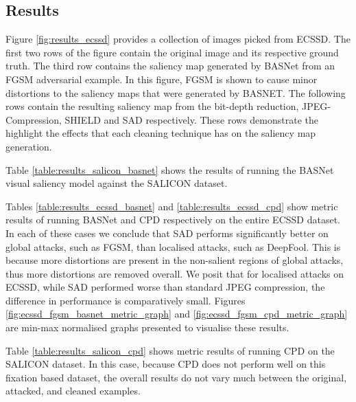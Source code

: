 \documentclass[10pt,twocolumn,letterpaper]{article}
\begin{document}
\subsection{Results} Figure \ref{fig:results_ecssd} provides a collection of images picked from ECSSD\cite{ECSSD}. The first two rows of the figure contain the original image and its respective ground truth. The third row contains the saliency map generated by BASNet\cite{BASNet} from an FGSM\cite{FGSM} adversarial example. In this figure, FGSM\cite{FGSM} is shown to cause minor distortions to the saliency maps that were generated by BASNET\cite{BASNet}. The following rows contain the resulting saliency map from the bit-depth reduction, JPEG-Compression, SHIELD\cite{das2018shield} and SAD respectively. These rows demonstrate the highlight the effects that each cleaning technique has on the saliency map generation. 

Table \ref{table:results_salicon_basnet} shows the results of running the BASNet\cite{BASNet} visual saliency model \cite{BASNet} against the SALICON\cite{jiang2015salicon} dataset. 

Tables \ref{table:results_ecssd_basnet} and \ref{table:results_ecssd_cpd} show metric results of running BASNet\cite{BASNet} and CPD\cite{wu2019cascaded} respectively on the entire ECSSD\cite{ECSSD} dataset. In each of these cases we conclude that SAD performs significantly better on global attacks, such as FGSM\cite{FGSM}, than localised attacks, such as DeepFool\cite{deepfool}. This is because more distortions are present in the non-salient regions of global attacks, thus more distortions are removed overall. We posit that for localised attacks on ECSSD\cite{ECSSD}, while SAD performed worse than standard JPEG compression, the difference in performance is comparatively small. Figures \ref{fig:ecssd_fgsm_basnet_metric_graph} and \ref{fig:ecssd_fgsm_cpd_metric_graph} are min-max normalised graphs presented to visualise these results.

Table \ref{table:results_salicon_cpd} shows metric results of running CPD\cite{wu2019cascaded} on the SALICON\cite{jiang2015salicon} dataset. In this case, because CPD\cite{wu2019cascaded} does not perform well on this fixation based dataset, the overall results do not vary much between the original, attacked, and cleaned examples.
\end{document}
